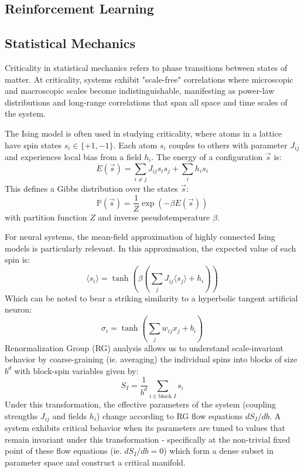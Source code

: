 \subsection{Reinforcement Learning}

\subsection{Statistical Mechanics}

Criticality in statistical mechanics refers to phase transitions between states of matter. At criticality, systems exhibit "scale-free" correlations where microscopic and macroscopic scales become indistinguishable, manifesting as power-law distributions and long-range correlations that span all space and time scales of the system.

The Ising model is often used in studying criticality, where atoms in a lattice have spin states $s_i \in \{+1, -1\}$. Each atom $s_i$ couples to others with parameter $J_{ij}$ and experiences local bias from a field $h_i$. The energy of a configuration $\vec{s}$ is:
\begin{equation}\label{eq:Ising}E(\vec{s}) = \sum_{i\neq j} J_{ij} s_is_j + \sum_i h_is_i\end{equation}
This defines a Gibbs distribution over the states $\vec{s}$:
\begin{equation}\label{eq:gibbs}\mathbb{P}(\vec{s})=\dfrac{1}{Z}\exp(-\beta E(\vec{s}))\end{equation}
with partition function $Z$ and inverse pseudotemperature $\beta$.

For neural systems, the mean-field approximation of highly connected Ising models is particularly relevant. In this approximation, the expected value of each spin is:
\begin{equation}\label{eq:meanfield}
\langle s_i \rangle = \tanh(\beta(\sum_j J_{ij}\langle s_j \rangle + h_i))
\end{equation}
Which can be noted to bear a striking similarity to a hyperbolic tangent artificial neuron:
\begin{equation}\label{eq:tanh_neuron}
\sigma_i = \tanh\left(\sum_j w_{ij}x_j + b_i\right)
\end{equation}
Renormalization Group (RG) analysis allows us to understand scale-invariant behavior by coarse-graining (ie. averaging) the individual spins into blocks of size $b^d$ with block-spin variables given by:
\begin{equation}\label{eq:rg_block}
S_I = \frac{1}{b^d}\sum_{i \in \text{block } I} s_i
\end{equation} Under this transformation, the effective parameters of the system (coupling strengths $J_{ij}$ and fields $h_i$) change according to RG flow equations $dS_I/db$. A system exhibits critical behavior when its parameters are tuned to values that remain invariant under this transformation  - specifically at the non-trivial fixed point of these flow equations (ie. $dS_I/db=0$) which form a dense subset in parameter space and construct a critical manifold.

